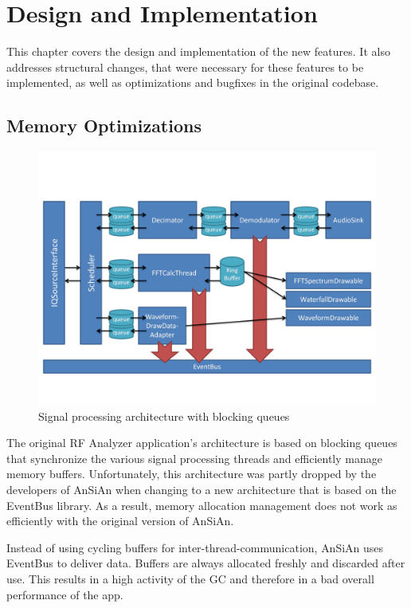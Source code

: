 \chapter{Design and Implementation}\label{ch:design_and_implementation}

This chapter covers the design and implementation of the new features. It also addresses structural changes, that were necessary for these features to be implemented, as well as optimizations and bugfixes in the original codebase.


\section{Memory Optimizations\label{sec:cleanup.mem}}

\begin{figure}
	\centering
	\includegraphics[width=1\linewidth]{gfx/queue_arch}
	\caption{Signal processing architecture with blocking queues}
	\label{fig:queue_architecture}
\end{figure}

The original RF Analyzer application's architecture is based on
blocking queues that synchronize the various signal processing threads
and efficiently manage memory buffers. Unfortunately, this
architecture was partly dropped by the developers of \ac{AnSiAn} when
changing to a new architecture that is based on the EventBus library. As a result, memory
allocation management does not work as efficiently with the original version
of \ac{AnSiAn}.

Instead of using cycling buffers for inter-thread-communication, \ac{AnSiAn} uses
EventBus to deliver data. Buffers are always allocated freshly
and discarded after use. This results in a high activity of the
\ac{GC} and therefore in a bad overall performance of the app.

